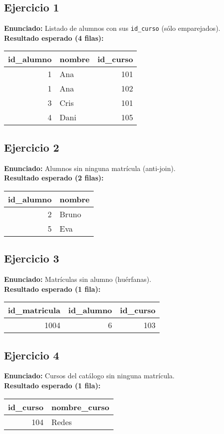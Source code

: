 \documentclass[11pt,a4paper]{article}
\begin{document}
\subsection*{Ejercicio 1}
\textbf{Enunciado:} Listado de alumnos con sus \texttt{id\_curso} (sólo emparejados).\\
\textbf{Resultado esperado (4 filas):}
\begin{center}
\begin{tabular}{r l r}
\toprule
id\_alumno & nombre & id\_curso \\
\midrule
1 & Ana  & 101 \\
1 & Ana  & 102 \\
3 & Cris & 101 \\
4 & Dani & 105 \\
\bottomrule
\end{tabular}
\end{center}

\subsection*{Ejercicio 2}
\textbf{Enunciado:} Alumnos sin ninguna matrícula (anti-join).\\
\textbf{Resultado esperado (2 filas):}
\begin{center}
\begin{tabular}{r l}
\toprule
id\_alumno & nombre \\
\midrule
2 & Bruno \\
5 & Eva \\
\bottomrule
\end{tabular}
\end{center}

\subsection*{Ejercicio 3}
\textbf{Enunciado:} Matrículas sin alumno (huérfanas).\\
\textbf{Resultado esperado (1 fila):}
\begin{center}
\begin{tabular}{r r r}
\toprule
id\_matricula & id\_alumno & id\_curso \\
\midrule
1004 & 6 & 103 \\
\bottomrule
\end{tabular}
\end{center}

\subsection*{Ejercicio 4}
\textbf{Enunciado:} Cursos del catálogo sin ninguna matrícula.\\
\textbf{Resultado esperado (1 fila):}
\begin{center}
\begin{tabular}{r l}
\toprule
id\_curso & nombre\_curso \\
\midrule
104 & Redes \\
\bottomrule
\end{tabular}
\end{center}
\end{document}
